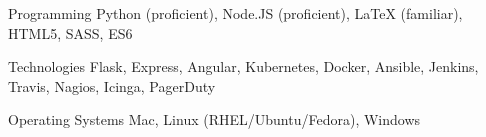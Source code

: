 
\begin{cvskills}

  \cvskill
    {Programming} %
    {Python (proficient), Node.JS (proficient), LaTeX (familiar), HTML5, SASS, ES6} %

  \cvskill
    {Technologies} %
    {Flask, Express, Angular, Kubernetes, Docker, Ansible, Jenkins, Travis, Nagios, Icinga, PagerDuty} %

  \cvskill
    {Operating Systems} %
    {Mac, Linux (RHEL/Ubuntu/Fedora), Windows} %

\end{cvskills}